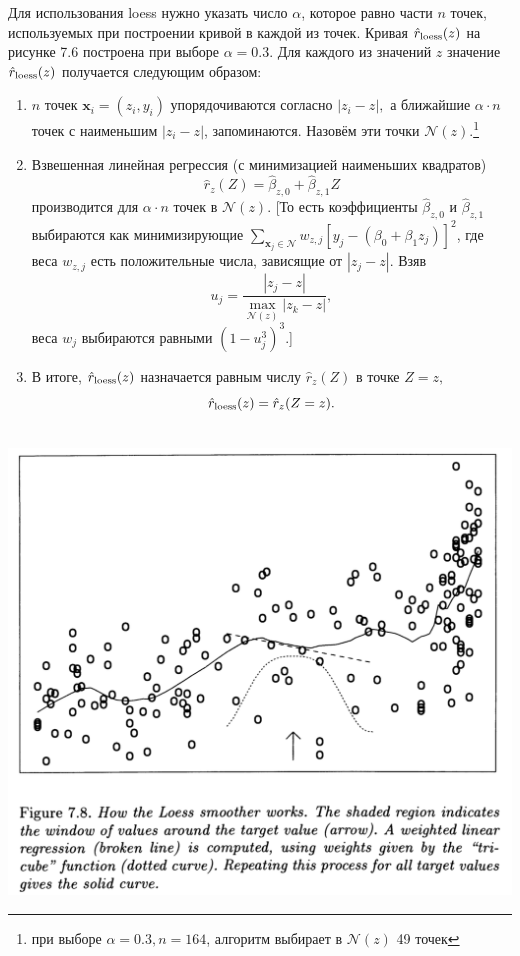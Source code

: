 Для использования loess нужно указать число $\alpha$, которое равно части $n$ точек, используемых при построении кривой в каждой из точек. Кривая $\hat{r}_{\text{loess}} (z)$ на рисунке 7.6 построена при выборе $\alpha = 0.3$. Для каждого из значений $z$ значение $\hat{r}_{\text{loess}} (z)$ получается следующим образом:
\begin{enumerate}
	\item $n$ точек $\mathbf x_i = (z_i, y_i)$  упорядочиваются согласно $|z_i - z|,$ а ближайшие $\alpha \cdot n$ точек с наименьшим $|z_i - z|$, запоминаются. Назовём эти точки $\mathcal N(z)$.\footnote{при выборе $\alpha= 0.3, n=164$, алгоритм выбирает в $\mathcal N(z)$ 49 точек}
	\item Взвешенная линейная регрессия (с минимизацией наименьших квадратов) 
	\begin{equation}
  	\hat r_z(Z) = \hat \beta_{z,0} + \hat \beta_{z,1} Z
	\end{equation}
	производится для $\alpha \cdot n$ точек в $\mathcal N(z)$. [То есть коэффициенты $ \hat \beta_{z,0}$ и $\hat \beta_{z,1}$ выбираются как минимизирующие $\sum_{\mathbf x_j \in \mathcal N} w_{z,j} [y_j - (\beta_0 + \beta_1 z_j)]^2$, где веса $w_{z,j}$ есть положительные числа, зависящие от $|z_j - z|$. Взяв 
	\begin{equation}
  u_j = \frac{|z_j - z|}{\max_{\mathcal N (z)}|z_k - z|},
\end{equation}
веса $w_j$ выбираются равными $(1 - u_j^3)^3$.]

	\item В итоге, $\hat{r}_{\text{loess}} (z)$ назначается равным числу $\hat r_z(Z)$ в точке $Z = z,$
\begin{equation}
  \hat{r}_{\text{loess}}(z) = \hat r_z (Z=z).
\end{equation}
\end{enumerate}
~\\
\noindent
\includegraphics[width=0.9\linewidth]{6/f78.png}
\newline
\setcounter{figure}{8}

